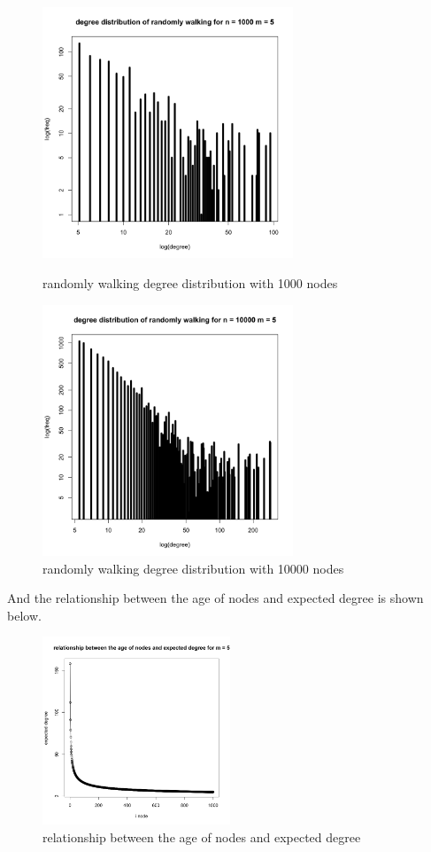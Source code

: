 \documentclass[draftcls,12pt,onecolumn]{IEEEtran}
\begin{document}
\begin{figure}[htbp]
\centering
\begin{minipage}[t]{0.48\textwidth}
\centering
\includegraphics[width=7.5cm]{img/2_g_2_degree3}
\caption{randomly walking degree distribution with 1000 nodes}
\end{minipage}
\begin{minipage}[t]{0.48\textwidth}
\centering
\includegraphics[width=7.5cm]{img/2_g_2_degree4}
\caption{randomly walking degree distribution with 10000 nodes}
\end{minipage}
\end{figure}
And the relationship between the age of nodes and expected degree is shown below.
\begin{figure}[H]
\centering
\includegraphics[width=0.5\textwidth]{img/2_g_2_relat}
\caption{relationship between the age of nodes and expected degree}
\end{figure}
\end{document}
